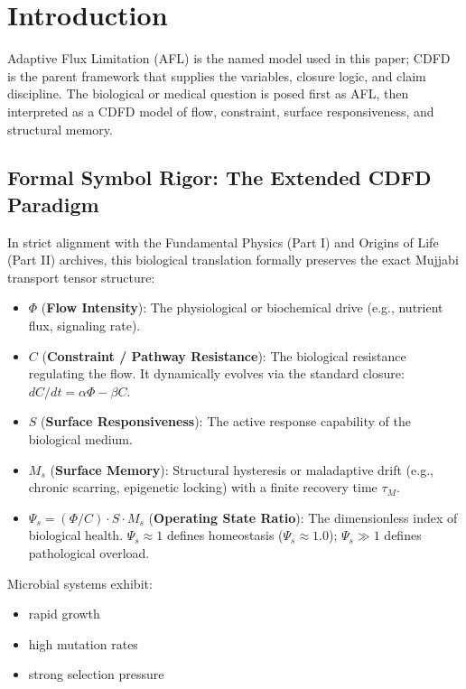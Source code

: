 \documentclass[11pt]{article}
\begin{document}
\section{Introduction}

Adaptive Flux Limitation (AFL) is the named model used in this paper; CDFD is the parent framework that supplies the variables, closure logic, and claim discipline. The biological or medical question is posed first as AFL, then interpreted as a CDFD model of flow, constraint, surface responsiveness, and structural memory.

\subsection{Formal Symbol Rigor: The Extended CDFD Paradigm}
In strict alignment with the Fundamental Physics (Part I) and Origins of Life (Part II) archives, this biological translation formally preserves the exact Mujjabi transport tensor structure:
\begin{itemize}
    \item $\Phi$ (\textbf{Flow Intensity}): The physiological or biochemical drive (e.g., nutrient flux, signaling rate).
    \item $C$ (\textbf{Constraint / Pathway Resistance}): The biological resistance regulating the flow. It dynamically evolves via the standard closure: $dC/dt = \alpha \Phi - \beta C$.
    \item $S$ (\textbf{Surface Responsiveness}): The active response capability of the biological medium.
    \item $M_s$ (\textbf{Surface Memory}): Structural hysteresis or maladaptive drift (e.g., chronic scarring, epigenetic locking) with a finite recovery time $\tau_M$.
    \item $\Psi_s = (\Phi/C) \cdot S \cdot M_s$ (\textbf{Operating State Ratio}): The dimensionless index of biological health. $\Psi_s \approx 1$ defines homeostasis ($\Psi_s \approx 1.0$); $\Psi_s \gg 1$ defines pathological overload.
\end{itemize}


Microbial systems exhibit:

\begin{itemize}
    \item rapid growth
    \item high mutation rates
    \item strong selection pressure
\end{itemize}
\end{document}
